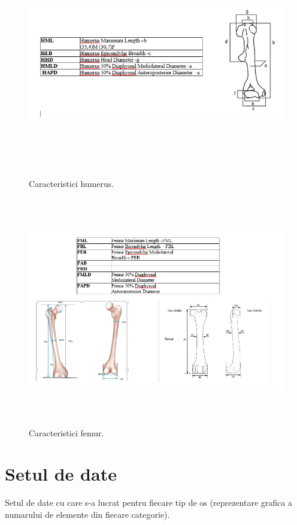\documentclass[runningheads,a4paper,11pt]{report}
\begin{document}
\begin{figure}[h!]
\centerline{\includegraphics[height=10cm]{Imagini/humerus.PNG}}
\caption{Caracteristici humerus.}
\label{fig}
\end{figure}

\begin{figure}[h!]
\centerline{\includegraphics[height=10cm]{Imagini/femur.PNG}}
\caption{Caracteristici femur.}
\label{fig}
\end{figure}

\section{Setul de date}
\label{section:date}
Setul de date cu care s-a lucrat pentru fiecare tip de os (reprezentare grafica a numarului de elemente din fiecare categorie).
\end{document}
